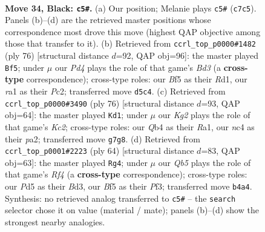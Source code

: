 \documentclass[11pt]{article}
\begin{document}
\clearpage

\begin{figure}[p]\centering
\begin{subfigure}{0.46\textwidth}\centering
\resizebox{\linewidth}{!}{%
\newchessgame
\chessboard[
  setfen={r2r4/1pp3kp/5p2/1N1p1bb1/1qNK4/4P3/P4P2/R7 b - - 3 34},
  showmover=false,
  pgfstyle=straightmove, color=movearrow, markmove={c7-c5}
]}
\caption{}
\end{subfigure}\hfill
\begin{subfigure}{0.46\textwidth}\centering
\resizebox{\linewidth}{!}{%
\newchessgame
\chessboard[
  setfen={q7/p3Qnk1/1p3n2/6p1/P1Pp1p2/3B1P1p/2P2P2/2KR4 w - - 0 39},
  showmover=false,
  pgfstyle=straightmove, color=movearrow, markmove={d3-f5}
]}
\caption{}
\end{subfigure}
\\[4pt]
\begin{subfigure}{0.46\textwidth}\centering
\resizebox{\linewidth}{!}{%
\newchessgame
\chessboard[
  setfen={8/5kp1/r1p2n1p/8/3P2P1/2P2R1P/p1KBrP2/R7 w - - 13 39},
  showmover=false,
  pgfstyle=straightmove, color=movearrow, markmove={c2-d1}
]}
\caption{}
\end{subfigure}\hfill
\begin{subfigure}{0.46\textwidth}\centering
\resizebox{\linewidth}{!}{%
\newchessgame
\chessboard[
  setfen={7r/5k2/p3p3/1prn1nBP/3p1R2/P2B1P2/2P5/2K4R w - - 1 33},
  showmover=false,
  pgfstyle=straightmove, color=movearrow, markmove={f4-g4}
]}
\caption{}
\end{subfigure}
\caption{\textbf{Move 34, Black: \texttt{c5\#}.} (a) Our position; Melanie plays \texttt{c5\#} (\texttt{c7c5}). Panels (b)--(d) are the retrieved master positions whose correspondence most drove this move (highest QAP objective among those that transfer to it). (b) Retrieved from \texttt{ccrl\_top\_p0000\#1482} (ply 76) [structural distance $d$=92, QAP obj=96]: the master played \texttt{Bf5}; under $\mu$ our \emph{Pd4} plays the role of that game's \emph{Bd3} (a \textbf{cross-type} correspondence); cross-type roles: our \emph{B}f5 as their \emph{R}d1, our \emph{r}a1 as their \emph{P}c2; transferred move \texttt{d5c4}. (c) Retrieved from \texttt{ccrl\_top\_p0000\#3490} (ply 76) [structural distance $d$=93, QAP obj=64]: the master played \texttt{Kd1}; under $\mu$ our \emph{Kg2} plays the role of that game's \emph{Kc2}; cross-type roles: our \emph{Q}b4 as their \emph{R}a1, our \emph{n}c4 as their \emph{p}a2; transferred move \texttt{g7g8}. (d) Retrieved from \texttt{ccrl\_top\_p0001\#2223} (ply 64) [structural distance $d$=83, QAP obj=63]: the master played \texttt{Rg4}; under $\mu$ our \emph{Qb5} plays the role of that game's \emph{Rf4} (a \textbf{cross-type} correspondence); cross-type roles: our \emph{P}d5 as their \emph{B}d3, our \emph{B}f5 as their \emph{P}f3; transferred move \texttt{b4a4}. Synthesis: no retrieved analog transferred to \texttt{c5\#} -- the \texttt{search} selector chose it on value (material / mate); panels (b)--(d) show the strongest nearby analogies.}
\label{fig:thought-m67}
\end{figure}
\end{document}
